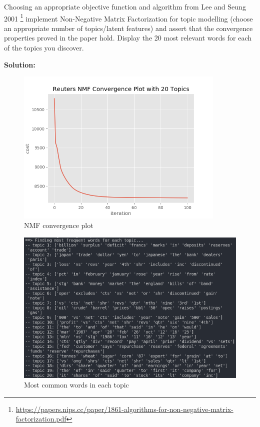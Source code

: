\documentclass[letter,11pt]{article}
\newenvironment{solution}{
    \vspace{0.16in} {\bf Solution:}
    
}{
	\vspace{0.16in}
}
\newcommand{\0}{\mathbf{0}}
\begin{document}
\begin{enumerate}
    Choosing an appropriate objective function and algorithm from Lee and Seung 2001 \footnote{\url{https://papers.nips.cc/paper/1861-algorithms-for-non-negative-matrix-factorization.pdf}} implement Non-Negative Matrix Factorization for topic modelling (choose an appropriate number of topics/latent features) and assert that the convergence properties proved in the paper hold. Display the 20 most relevant words for each of the topics you discover.

    \begin{solution}
        \begin{figure}[H]
            \centering
            \includegraphics[width=10cm]{nmf_cvg.png}
            \caption{NMF convergence plot}
        \end{figure}

        \begin{figure}[H]
            \centering
            \includegraphics[width=12cm]{q2.png}
            \caption{Most common words in each topic}
        \end{figure}
    \end{solution}


\end{enumerate}
\end{document}
